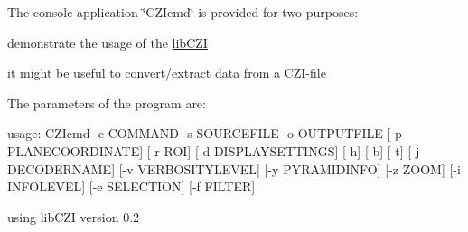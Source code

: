 The console application \char`\"{}\+C\+Z\+Icmd\char`\"{} is provided for two purposes\+:
\begin{DoxyItemize}
\item demonstrate the usage of the \hyperlink{namespacelib_c_z_i}{lib\+C\+ZI}
\item it might be useful to convert/extract data from a C\+Z\+I-\/file
\end{DoxyItemize}

The parameters of the program are\+: \begin{DoxyVerb}usage: CZIcmd -c COMMAND -s SOURCEFILE -o OUTPUTFILE [-p PLANECOORDINATE]
                 [-r ROI] [-d DISPLAYSETTINGS] [-h] [-b] [-t] [-j DECODERNAME] 
                 [-v VERBOSITYLEVEL] [-y PYRAMIDINFO] [-z ZOOM] [-i INFOLEVEL]
                 [-e SELECTION] [-f FILTER]

  using libCZI version 0.2


\end{DoxyVerb}

